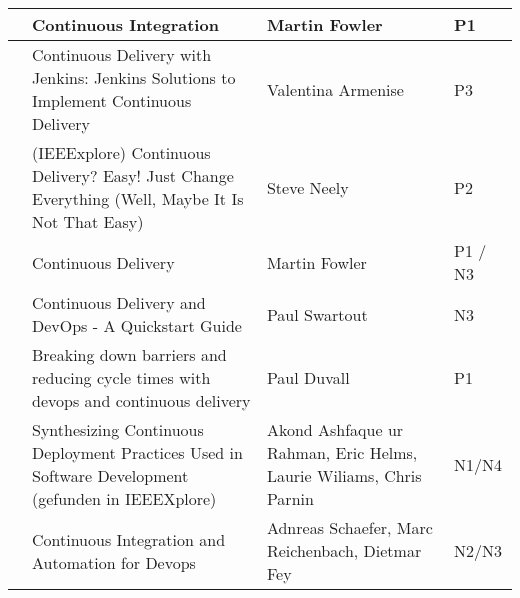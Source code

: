 \begin{landscape}
\begin{longtable}{|l|L{10cm}|L{10cm}|l|}
    \hline \hline
    \endlastfoot
    
    
     & Continuous Integration & Martin Fowler & P1 \\ \hline
    
     & Continuous Delivery with Jenkins: Jenkins Solutions to Implement Continuous Delivery & Valentina Armenise & P3\\ \hline
    
     &  (IEEExplore) Continuous Delivery? Easy! Just Change Everything (Well, Maybe It Is Not That Easy) & Steve Neely & P2\\ \hline
    
     & Continuous Delivery & Martin Fowler & P1 / N3 \\ \hline
    
     & Continuous Delivery and DevOps - A Quickstart Guide & Paul Swartout & N3 \\ \hline
    
     & Breaking down barriers and reducing cycle times with devops and continuous delivery & Paul Duvall & P1 \\ \hline
    
     & Synthesizing Continuous Deployment Practices Used in Software Development (gefunden in IEEEXplore) & Akond Ashfaque ur Rahman, Eric Helms, Laurie Wiliams, Chris Parnin & N1/N4 \\ \hline
    
     & Continuous Integration and Automation for Devops & Adnreas Schaefer, Marc Reichenbach, Dietmar Fey & N2/N3 \\ \hline
    
\end{longtable} 
\noindent
\end{landscape}